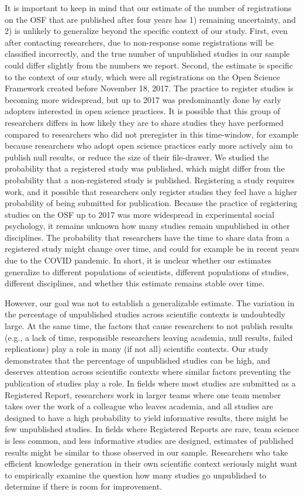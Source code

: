 \documentclass[
  ,jou, a4paper,floatsintext]{apa6}
\begin{document}
It is important to keep in mind that our estimate of the number of registrations on the OSF that are published after four years has 1) remaining uncertainty, and 2) is unlikely to generalize beyond the specific context of our study. First, even after contacting researchers, due to non-response some registrations will be classified incorrectly, and the true number of unpublished studies in our sample could differ slightly from the numbers we report. Second, the estimate is specific to the context of our study, which were all registrations on the Open Science Framework created before November 18, 2017. The practice to register studies is becoming more widespread, but up to 2017 was predominantly done by early adopters interested in open science practices. It is possible that this group of researchers differs in how likely they are to share studies they have performed compared to researchers who did not preregister in this time-window, for example because researchers who adopt open science practices early more actively aim to publish null results, or reduce the size of their file-drawer. We studied the probability that a registered study was published, which might differ from the probability that a non-registered study is published. Registering a study requires work, and it possible that researchers only register studies they feel have a higher probability of being submitted for publication. Because the practice of registering studies on the OSF up to 2017 was more widespread in experimental social psychology, it remains unknown how many studies remain unpublished in other disciplines. The probability that researchers have the time to share data from a registered study might change over time, and could for example be in recent years due to the COVID pandemic. In short, it is unclear whether our estimates generalize to different populations of scientists, different populations of studies, different disciplines, and whether this estimate remains stable over time.

However, our goal was not to establish a generalizable estimate. The variation in the percentage of unpublished studies across scientific contexts is undoubtedly large. At the same time, the factors that cause researchers to not publish results (e.g., a lack of time, responsible researchers leaving academia, null results, failed replications) play a role in many (if not all) scientific contexts. Our study demonstrates that the percentage of unpublished studies can be high, and deserves attention across scientific contexts where similar factors preventing the publication of studies play a role. In fields where most studies are submitted as a Registered Report, researchers work in larger teams where one team member takes over the work of a colleague who leaves academia, and all studies are designed to have a high probability to yield informative results, there might be few unpublished studies. In fields where Registered Reports are rare, team science is less common, and less informative studies are designed, estimates of published results might be similar to those observed in our sample. Researchers who take efficient knowledge generation in their own scientific context seriously might want to empirically examine the question how many studies go unpublished to determine if there is room for improvement.
\end{document}
